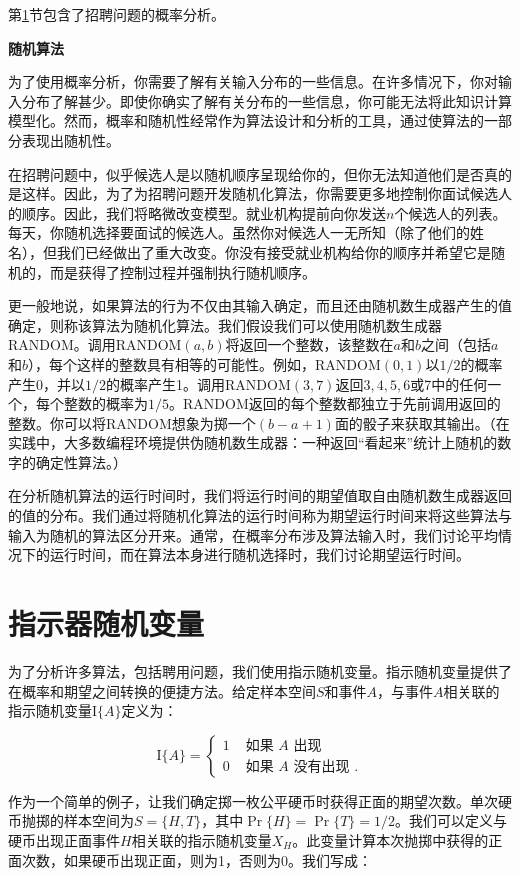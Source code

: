 \documentclass[lang=cn,newtx,10pt,scheme=chinese]{elegantbook}
\begin{document}
第\ref{section-5.2}节包含了招聘问题的概率分析。

\textbf{随机算法}

为了使用概率分析，你需要了解有关输入分布的一些信息。在许多情况下，你对输入分布了解甚少。即使你确实了解有关分布的一些信息，你可能无法将此知识计算模型化。然而，概率和随机性经常作为算法设计和分析的工具，通过使算法的一部分表现出随机性。

在招聘问题中，似乎候选人是以随机顺序呈现给你的，但你无法知道他们是否真的是这样。因此，为了为招聘问题开发随机化算法，你需要更多地控制你面试候选人的顺序。因此，我们将略微改变模型。就业机构提前向你发送$n$个候选人的列表。每天，你随机选择要面试的候选人。虽然你对候选人一无所知（除了他们的姓名），但我们已经做出了重大改变。你没有接受就业机构给你的顺序并希望它是随机的，而是获得了控制过程并强制执行随机顺序。

更一般地说，如果算法的行为不仅由其输入确定，而且还由随机数生成器产生的值确定，则称该算法为随机化算法。我们假设我们可以使用随机数生成器RANDOM。调用RANDOM$(a,b)$将返回一个整数，该整数在$a$和$b$之间（包括$a$和$b$），每个这样的整数具有相等的可能性。例如，RANDOM$(0,1)$以$1/2$的概率产生0，并以$1/2$的概率产生1。调用RANDOM$(3,7)$返回$3,4,5,6$或7中的任何一个，每个整数的概率为$1/5$。RANDOM返回的每个整数都独立于先前调用返回的整数。你可以将RANDOM想象为掷一个$(b-a+1)$面的骰子来获取其输出。（在实践中，大多数编程环境提供伪随机数生成器：一种返回``看起来''统计上随机的数字的确定性算法。）

在分析随机算法的运行时间时，我们将运行时间的期望值取自由随机数生成器返回的值的分布。我们通过将随机化算法的运行时间称为期望运行时间来将这些算法与输入为随机的算法区分开来。通常，在概率分布涉及算法输入时，我们讨论平均情况下的运行时间，而在算法本身进行随机选择时，我们讨论期望运行时间。

\section{指示器随机变量}\label{section-5.2}

为了分析许多算法，包括聘用问题，我们使用指示随机变量。指示随机变量提供了在概率和期望之间转换的便捷方法。给定样本空间$S$和事件$A$，与事件$A$相关联的指示随机变量$\mathrm{I}\{A\}$定义为：

$$
\mathrm{I}\{A\}= \begin{cases}1 & \text { 如果 } A \text { 出现 } \\ 0 & \text { 如果 } A \text { 没有出现 } .\end{cases}
$$

作为一个简单的例子，让我们确定掷一枚公平硬币时获得正面的期望次数。单次硬币抛掷的样本空间为$S=\{H, T\}$，其中$\operatorname{Pr}\{H\}=\operatorname{Pr}\{T\}=1 / 2$。我们可以定义与硬币出现正面事件$H$相关联的指示随机变量$X_H$。此变量计算本次抛掷中获得的正面次数，如果硬币出现正面，则为1，否则为0。我们写成：
\end{document}

